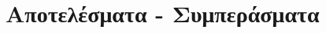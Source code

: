 \documentclass[11pt,a4paper,english,greek,twoside]{../Thesis}
\begin{document}
\chapter{Αποτελέσματα - Συμπεράσματα} \label{chap:Results}
\end{document}
